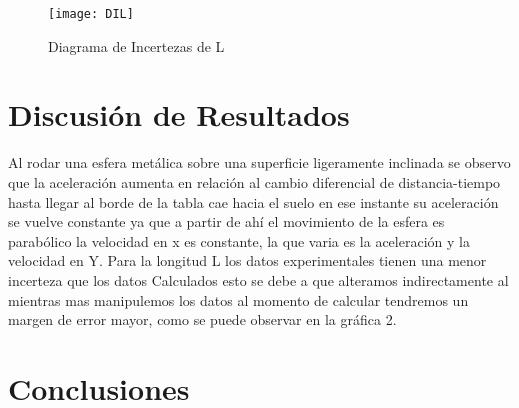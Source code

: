 \documentclass[osajnl,twocolumn,showpacs,superscriptaddress,10pt]{revtex4-1}
\begin{document}
\begin{figure}[H]
	\centering
	\caption{Diagrama de Incertezas de L}
	\texttt{[image: DIL]}
\end{figure}

\section{Discusión de Resultados}
Al rodar una esfera metálica sobre una superficie ligeramente inclinada se observo   que la aceleración aumenta en relación al cambio diferencial de distancia-tiempo  hasta llegar al borde de la tabla cae  hacia el suelo en ese instante su  aceleración se vuelve constante ya que a partir de ahí el movimiento de la esfera es  parabólico la velocidad en x es constante,  la que varia es la aceleración y la velocidad  en  Y. Para la longitud L los datos experimentales tienen una menor incerteza que los datos Calculados esto se debe a que alteramos indirectamente al mientras mas manipulemos los datos al momento de calcular  tendremos un margen de error mayor, como se puede observar en la gráfica 2.

\section{Conclusiones}
\end{document}
